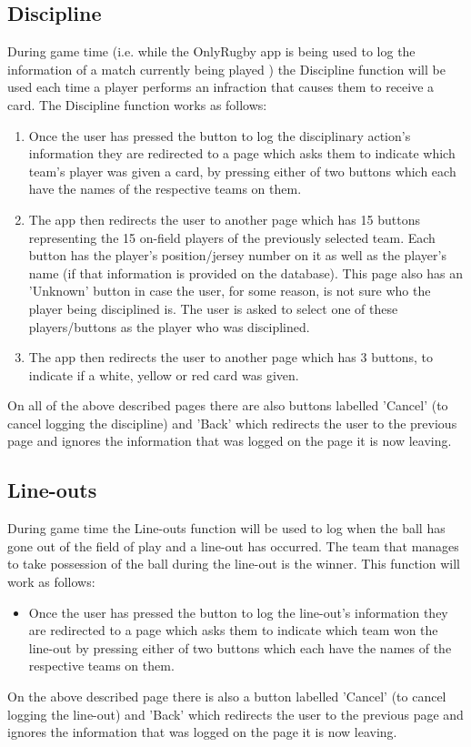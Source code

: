 \documentclass[hidelinks,a4paper,12pt]{article}
\begin{document}
	\subsection{Discipline}
		During game time (i.e. while the OnlyRugby app is being used to log the information of a match currently being played ) the Discipline function will be used each time a player performs an infraction that causes them to receive a card. The Discipline function works as follows:
		\begin{enumerate}
			\item Once the user has pressed the button to log the disciplinary action's information they are redirected to a page which asks them to indicate which team's player was given a card, by pressing either of two buttons which each have the names of the respective teams on them.
			\item The app then redirects the user to another page which has 15 buttons representing the 15 on-field players of the previously selected team. Each button has the player's position/jersey number on it as well as the player's name (if that information is provided on the database). This page also has an 'Unknown' button in case the user, for some reason, is not sure who the player being disciplined is. The user is asked to select one of these players/buttons as the player who was disciplined.
			\item The app then redirects the user to another page which has 3 buttons, to indicate if a white, yellow or red card was given.
		\end{enumerate}
	On all of the above described pages there are also buttons labelled 'Cancel' (to cancel logging the discipline) and 'Back' which redirects the user to the previous page and ignores the information that was logged on the page it is now leaving.

	\subsection{Line-outs}
	During game time the Line-outs function will be used to log when the ball has gone out of the field of play and a line-out has occurred. The team that manages to take possession of the ball during the line-out is the winner. This function will work as follows:
	\begin{itemize}
		\item Once the user has pressed the button to log the line-out's information they are redirected to a page which asks them to indicate which team won the line-out by pressing either of two buttons which each have the names of the respective teams on them.
	\end{itemize}
	On the above described page there is also a button labelled 'Cancel' (to cancel logging the line-out) and 'Back' which redirects the user to the previous page and ignores the information that was logged on the page it is now leaving.
\end{document}

